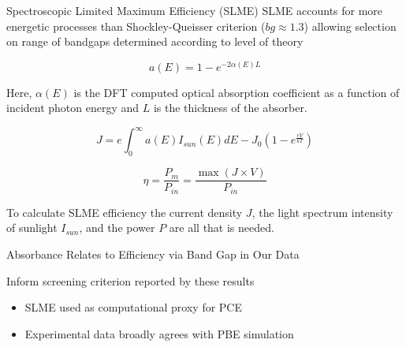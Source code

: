 \documentclass[10pt, aspectratio=169, presentation]{beamer}
\begin{document}
\begin{frame}[label={sec:org67a5bb5}]{Spectroscopic Limited Maximum Efficiency (SLME)}
SLME accounts for more energetic processes than Shockley-Queisser
criterion (\(bg \approx 1.3\)) allowing selection on range of bandgaps
determined according to level of theory\autocite[p.1]{yu-2012-ident-poten}

\[
a(E)=1-e^{-2\alpha(E)L}
\]

Here, \(\alpha(E)\) is the DFT computed optical absorption coefficient
as a function of incident photon energy and \(L\) is the thickness of
the absorber.

\[
J=e\int_{0}^{\infty} a(E)I_{sun}(E)dE - J_{0}(1-e^{\frac{eV}{kT}})
\]

\[
\eta = \frac{P_{m}}{P_{in}}=\frac{\max(J \times V)}{P_{in}}
\]

To calculate SLME efficiency the current density \(J\), the light
spectrum intensity of sunlight \(I_{sun}\), and the power \(P\) are
all that is needed.
\end{frame}

\begin{frame}[label={sec:org13139b2}]{Absorbance Relates to Efficiency via Band Gap in Our Data}
 
\begin{center}

\end{center}

Inform screening criterion reported by these results\autocite{yang-2023-high-throug} 
\begin{itemize}
\item SLME used as computational proxy for PCE
\item Experimental data\autocite{almora-2020-devic-perfor} broadly agrees with PBE simulation
\end{itemize}
\end{frame}
\end{document}
